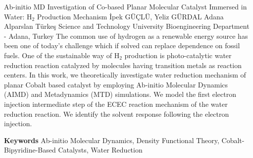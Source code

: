 
    \begin{abstract_online}{Ab-initio MD Investigation of Co-based Planar Molecular Catalyst Immersed in Water: $\mathrm{H}_{2}$ Production Mechanism}{%
        İpek GÜÇLÜ, Yeliz GÜRDAL}{%
        }{%
        Adana Alparslan Türkeş Science and Technology University Bioengineering Department - Adana, Turkey}
    The common use of hydrogen as a renewable energy source has been one of today's challenge which if solved can replace dependence on fossil fuels. One of the sustainable way of $\mathrm{H}_{2}$ production is photo-catalytic water reduction reaction catalyzed by molecules having transition metals as reaction centers. In this work, we theoretically investigate water reduction mechanism of planar Cobalt based catalyst by employing Ab-initio Molecular Dynamics (AIMD) and Metadynamics (MTD) simulations. We model the first electron injection intermediate step of the ECEC reaction mechanism of the water reduction reaction. We identify the solvent response following the electron injection. 
    
        \textbf{Keywords} \newline{}Ab-initio Molecular Dynamics, Density Functional Theory, Cobalt-Bipyridine-Based Catalysts, Water Reduction
    \end{abstract_online}
    